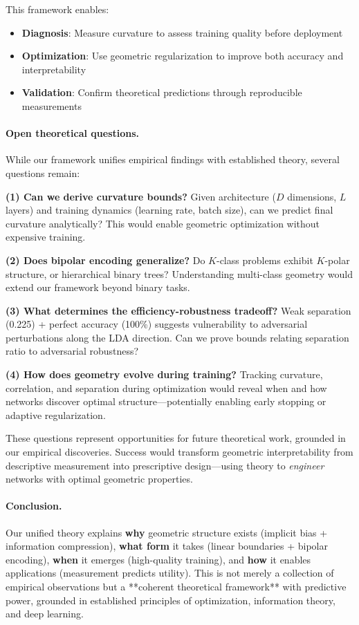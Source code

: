 \documentclass[11pt]{article}
\begin{document}
This framework enables:
\begin{itemize}
\item \textbf{Diagnosis}: Measure curvature to assess training quality before deployment
\item \textbf{Optimization}: Use geometric regularization to improve both accuracy and interpretability  
\item \textbf{Validation}: Confirm theoretical predictions through reproducible measurements
\end{itemize}

\paragraph{Open theoretical questions.}
While our framework unifies empirical findings with established theory, several questions remain:

\textbf{(1) Can we derive curvature bounds?} Given architecture ($D$ dimensions, $L$ layers) and training dynamics (learning rate, batch size), can we predict final curvature analytically? This would enable geometric optimization without expensive training.

\textbf{(2) Does bipolar encoding generalize?} Do $K$-class problems exhibit $K$-polar structure, or hierarchical binary trees? Understanding multi-class geometry would extend our framework beyond binary tasks.

\textbf{(3) What determines the efficiency-robustness tradeoff?} Weak separation (0.225) + perfect accuracy (100\%) suggests vulnerability to adversarial perturbations along the LDA direction. Can we prove bounds relating separation ratio to adversarial robustness?

\textbf{(4) How does geometry evolve during training?} Tracking curvature, correlation, and separation during optimization would reveal when and how networks discover optimal structure—potentially enabling early stopping or adaptive regularization.

These questions represent opportunities for future theoretical work, grounded in our empirical discoveries. Success would transform geometric interpretability from descriptive measurement into prescriptive design—using theory to \textit{engineer} networks with optimal geometric properties.

\paragraph{Conclusion.}
Our unified theory explains \textbf{why} geometric structure exists (implicit bias + information compression), \textbf{what form} it takes (linear boundaries + bipolar encoding), \textbf{when} it emerges (high-quality training), and \textbf{how} it enables applications (measurement predicts utility). This is not merely a collection of empirical observations but a **coherent theoretical framework** with predictive power, grounded in established principles of optimization, information theory, and deep learning.
\end{document}
